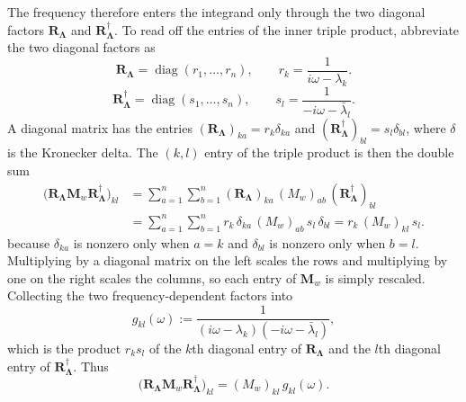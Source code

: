 \documentclass[12pt]{article}
\newcommand{\RL}{\mathbf{R}_{\boldsymbol{\Lambda}}}
\begin{document}
The frequency therefore enters the integrand only through the two diagonal factors $\RL$ and $\RL^{\dagger}$. To read off the entries of the inner triple product, abbreviate the two diagonal factors as
\begin{equation}
    \RL=\operatorname{diag}(r_1,\dots,r_n),
    \qquad r_k=\frac{1}{i\omega-\lambda_k}.
    \label{eq:RL_entries}
\end{equation}
\begin{equation}
    \RL^{\dagger}=\operatorname{diag}(s_1,\dots,s_n),
    \qquad s_l=\frac{1}{-i\omega-\bar\lambda_l}.
    \label{eq:RLdag_entries}
\end{equation}
A diagonal matrix has the entries $(\RL)_{ka}=r_k\delta_{ka}$ and $(\RL^{\dagger})_{bl}=s_l\delta_{bl}$, where $\delta$ is the Kronecker delta.
The $(k,l)$ entry of the triple product is then the double sum
\begin{equation}
    \begin{aligned}
        \bigl(\RL\mathbf{M}_w\RL^{\dagger}\bigr)_{kl}
        &=\sum_{a=1}^{n}\sum_{b=1}^{n}(\RL)_{ka}\,(M_w)_{ab}\,(\RL^{\dagger})_{bl}\\
        &=\sum_{a=1}^{n}\sum_{b=1}^{n}r_k\,\delta_{ka}\,(M_w)_{ab}\,s_l\,\delta_{bl}
        =r_k\,(M_w)_{kl}\,s_l .
    \end{aligned}
    \label{eq:triple_product_entry}
\end{equation}
because $\delta_{ka}$ is nonzero only when $a=k$ and $\delta_{bl}$ is nonzero only when $b=l$. Multiplying by a diagonal
matrix on the left scales the rows and multiplying by one on the right scales the columns, so each entry of $\mathbf{M}_w$ is
simply rescaled. Collecting the two frequency-dependent factors into
\begin{equation}
    g_{kl}(\omega):=\frac{1}{(i\omega-\lambda_k)(-i\omega-\bar\lambda_l)} ,
    \label{eq:g_def}
\end{equation}
which is the product $r_ks_l$ of the $k$th diagonal entry of $\RL$ and the $l$th diagonal entry of $\RL^{\dagger}$. Thus
\begin{equation}
    \bigl(\RL\mathbf{M}_w\RL^{\dagger}\bigr)_{kl}=(M_w)_{kl}\,g_{kl}(\omega).
    \label{eq:triple_product_g}
\end{equation}
\end{document}
